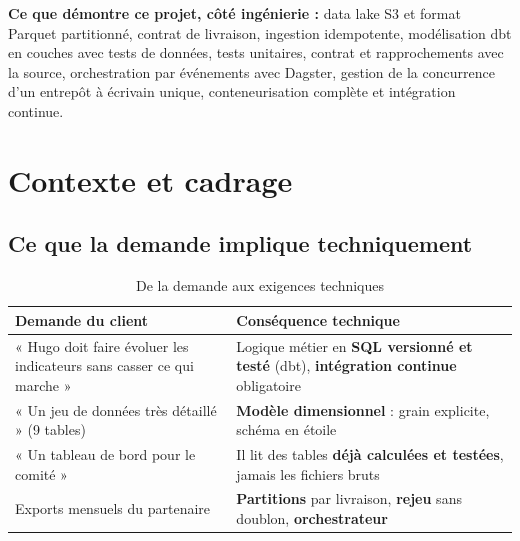 \documentclass[11pt, a4paper, oneside, headings=normal, numbers=noenddot, DIV=12]{scrartcl}
\begin{document}
\textbf{Ce que démontre ce projet, côté ingénierie :} data lake S3 et format Parquet partitionné, contrat de livraison, ingestion idempotente,
modélisation dbt en couches avec tests de données, tests unitaires, contrat et rapprochements avec la source, orchestration par
événements avec Dagster, gestion de la concurrence d'un entrepôt à écrivain unique, conteneurisation complète et intégration continue.

\section{Contexte et cadrage}

\subsection{Ce que la demande implique techniquement}
\begin{table}[H]
\centering\small
\begin{tabularx}{\linewidth}{@{}L{5.4cm} Y@{}}
\toprule
\textbf{Demande du client} & \textbf{Conséquence technique} \\
\midrule
« Hugo doit faire évoluer les indicateurs sans casser ce qui marche » & Logique métier en \textbf{SQL versionné et testé} (dbt), \textbf{intégration continue} obligatoire \\
« Un jeu de données très détaillé » (9 tables) & \textbf{Modèle dimensionnel} : grain explicite, schéma en étoile \\
« Un tableau de bord pour le comité » & Il lit des tables \textbf{déjà calculées et testées}, jamais les fichiers bruts \\
Exports mensuels du partenaire & \textbf{Partitions} par livraison, \textbf{rejeu} sans doublon, \textbf{orchestrateur} \\
\bottomrule
\end{tabularx}
\caption{De la demande aux exigences techniques}
\end{table}
\end{document}
